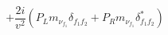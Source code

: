 %
\begin{dmath*}
%
  +  \frac{2 i}{v^2} \left(P_L m_{\nu_{f_1}} \delta_{f_1 f_2} + P_R m_{\nu_{f_1}} \delta_{f_1 f_2}^*\right)
%
\end{dmath*}
%
